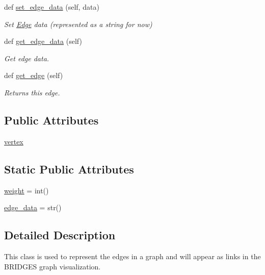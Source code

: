 \begin{DoxyCompactItemize}
def \mbox{\hyperlink{classbridges_1_1edge_1_1_edge_ad417d82a7b7277f3529667e1e2b280e9}{set\+\_\+edge\+\_\+data}} (self, data)
\begin{DoxyCompactList}\small\item\em Set \mbox{\hyperlink{classbridges_1_1edge_1_1_edge}{Edge}} data (represented as a string for now) \end{DoxyCompactList}\item 
def \mbox{\hyperlink{classbridges_1_1edge_1_1_edge_ae26e8172b91667d829b86145ce88208e}{get\+\_\+edge\+\_\+data}} (self)
\begin{DoxyCompactList}\small\item\em Get edge data. \end{DoxyCompactList}\item 
def \mbox{\hyperlink{classbridges_1_1edge_1_1_edge_a406b906ea8e177a6e54f6c794c04df3d}{get\+\_\+edge}} (self)
\begin{DoxyCompactList}\small\item\em Returns this edge. \end{DoxyCompactList}\end{DoxyCompactItemize}
\subsection*{Public Attributes}
\begin{DoxyCompactItemize}
\item 
\mbox{\hyperlink{classbridges_1_1edge_1_1_edge_af894a206ef35d03cdb75faea83a0fc5a}{vertex}}
\end{DoxyCompactItemize}
\subsection*{Static Public Attributes}
\begin{DoxyCompactItemize}
\item 
\mbox{\hyperlink{classbridges_1_1edge_1_1_edge_a1137b3a75c3bffd6cfccb994fd9a5c13}{weight}} = int()
\item 
\mbox{\hyperlink{classbridges_1_1edge_1_1_edge_af9697b2b1e1e87d880a10c0c4e7de70d}{edge\+\_\+data}} = str()
\end{DoxyCompactItemize}


\subsection{Detailed Description}
This class is used to represent the edges in a graph and will appear as links in the B\+R\+I\+D\+G\+ES graph visualization. 

